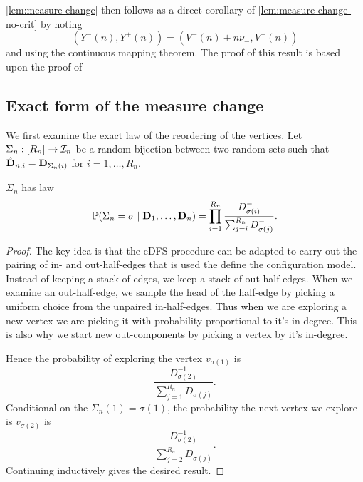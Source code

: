\cref{lem:measure-change} then follows as a direct corollary of \cref{lem:measure-change-no-crit} by noting
\begin{equation*}
    \left( 
        Y^-(n), Y^+(n)
     \right) =
    \left( 
        V^-(n) + n \nu_-, V^+(n)
     \right)
\end{equation*}
and using the continuous mapping theorem. The proof of this result is based upon the proof of \cite[Lemma~6.7]{conchon--kerjanStableGraphMetric2020}

\subsection{Exact form of the measure change}

We first examine the exact law of the reordering of the vertices. Let $\Sigma_n: [R_n] \to {\mathcal I}_n$ be a random bijection between two random sets such that $\hat{{\mathbf D}}_{n, i} = {\mathbf D}_{\Sigma_n(i)}$ for $i = 1, \ldots, R_n$.

\begin{lemma}
    $\Sigma_n$ has law
    \begin{equation*}
        {\mathbb P}(\Sigma_n = \sigma \mid {\mathbf D}_1, \ldots, {\mathbf D}_n)
        = \prod_{i=1}^{R_n} \frac{D^-_{\sigma(i)}}{\sum_{j=i}^{R_n} D^-_{\sigma(j)}}.
    \end{equation*}
\end{lemma}
\begin{proof}
    The key idea is that the eDFS procedure can be adapted to carry out the pairing of in- and out-half-edges that is used the define the configuration model. Instead of keeping a stack of edges, we keep a stack of out-half-edges. When we examine an out-half-edge, we sample the head of the half-edge by picking a uniform choice from the unpaired in-half-edges. Thus when we are exploring a new vertex we are picking it with probability proportional to it's in-degree. This is also why we start new out-components by picking a vertex by it's in-degree.

    Hence the probability of exploring the vertex $v_{\sigma(1)}$ is
    \begin{equation*}
        \frac{D_{\sigma(2)}^{-1}}{\sum_{j=1}^{R_n} D_{\sigma(j)}}.
    \end{equation*}
    Conditional on the $\Sigma_n(1) = \sigma(1)$, the probability the next vertex we explore is $v_{\sigma(2)}$ is
    \begin{equation*}
        \frac{D_{\sigma(2)}^{-1}}{\sum_{j=2}^{R_n} D_{\sigma(j)}}.
    \end{equation*}
    Continuing inductively gives the desired result.
\end{proof}

